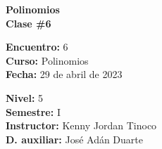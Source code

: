 \begin{center} \textbf
{
    \Large Polinomios \\ \vspace{2mm}Clase \#6
}
\end{center}

\begin{multicols}{2}
{
    \textbf{Encuentro:} 6\\
    \textbf{Curso:} Polinomios\\
    \textbf{Fecha:} 29 de abril de 2023\\
    \begin{flushright}
        \textbf{Nivel:} 5\\
        \textbf{Semestre:} I\\
        \textbf{Instructor:} Kenny Jordan Tinoco\\
        \textbf{D. auxiliar: }José Adán Duarte
    \end{flushright}
}
\end{multicols}

\thispagestyle{first-page-style}